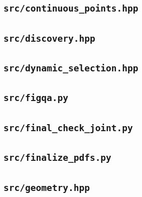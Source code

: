 \subsection*{\texttt{src/continuous\_points.hpp}}

\subsection*{\texttt{src/discovery.hpp}}

\subsection*{\texttt{src/dynamic\_selection.hpp}}

\subsection*{\texttt{src/figqa.py}}

\subsection*{\texttt{src/final\_check\_joint.py}}

\subsection*{\texttt{src/finalize\_pdfs.py}}

\subsection*{\texttt{src/geometry.hpp}}

